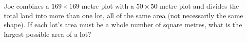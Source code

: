 Joe combines a $169\times169$ metre plot with a $50\times50$ metre plot and divides the total land into more than one lot, all of the same area (not necessarily the same shape). If each lot's area must be a whole number of square metres, what is the largest possible area of a lot?
